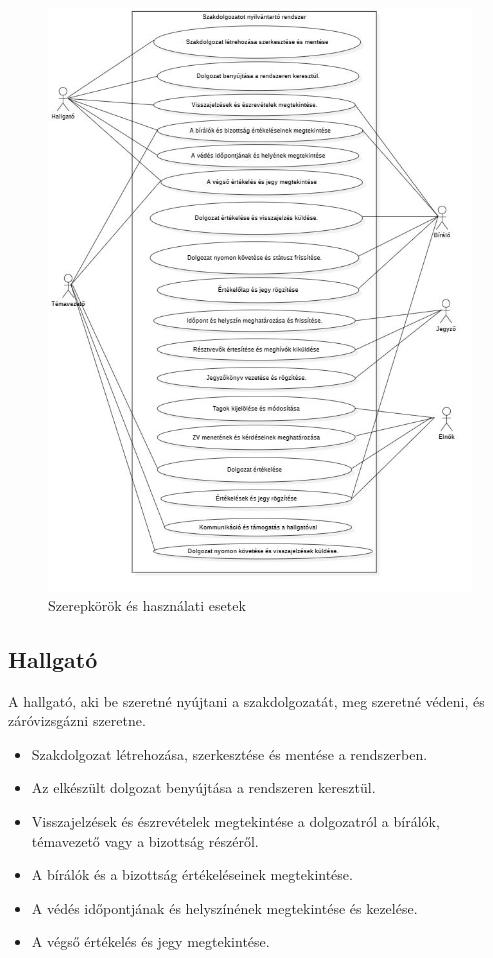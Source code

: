 \documentclass[a4paper,12pt]{article}
\begin{document}
\begin{figure}
	\centering
	\includegraphics[width=\textwidth]{images/Use-case_diagram/use-case_1.jpg}
	\caption{Szerepkörök és használati esetek}
	\label{fig:use-cases}
\end{figure}

\subsection{Hallgató}

A hallgató, aki be szeretné nyújtani a szakdolgozatát, meg szeretné védeni, és záróvizsgázni szeretne.
\begin{itemize}
\item Szakdolgozat létrehozása, szerkesztése és mentése a rendszerben.
\item Az elkészült dolgozat benyújtása a rendszeren keresztül.
\item Visszajelzések és észrevételek megtekintése a dolgozatról a bírálók, témavezető vagy a bizottság részéről.
\item A bírálók és a bizottság értékeléseinek megtekintése.
\item A védés időpontjának és helyszínének megtekintése és kezelése.
\item A végső értékelés és jegy megtekintése.
\end{itemize}
\end{document}
